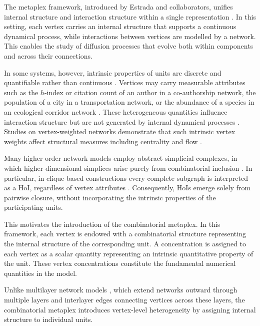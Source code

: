 \documentclass[12pt]{article}
\theoremstyle{normalhead_nobrackets}
\theoremstyle{exampstyle}
\begin{document}
The metaplex framework, introduced by Estrada and collaborators, unifies internal structure and interaction structure within a single representation \cite{estrada2020metaplex, miranda2023simplicial}. In this setting, each vertex carries an internal structure that supports a continuous dynamical process, while interactions between vertices are modelled by a network. This enables the study of diffusion processes that evolve both within components and across their connections.

In some systems, however, intrinsic properties of units are discrete and quantifiable rather than continuous \cite{bairey2016high, badalyan2024structure, nakajima2025inference, contisciani2025flexible}. Vertices may carry measurable attributes such as the 
$h$-index or citation count of an author in a co-authorship network, the population of a city in a transportation network, or the abundance of a species in an ecological corridor network \cite{singh2020node, shanu2019graph, contisciani2025flexible}. These heterogeneous quantities influence interaction structure but are not generated by internal dynamical processes \cite{miranda2023simplicial}. Studies on vertex-weighted networks demonstrate that such intrinsic vertex weights affect structural measures including centrality and flow \cite{singh2020node}.

Many higher-order network models employ abstract simplicial complexes, in which higher-dimensional simplices arise purely from combinatorial inclusion \cite{zhao2021simplicial}. In particular, in clique-based constructions every complete subgraph is interpreted as a HoI, regardless of vertex attributes \cite{raj2024structure, giusti2016two}. Consequently, HoIs emerge solely from pairwise closure, without incorporating the intrinsic properties of the participating units.

This motivates the introduction of the combinatorial metaplex. In this framework, each vertex is endowed with a combinatorial structure representing the internal structure of the corresponding unit. A concentration is assigned to each vertex as a scalar quantity representing an intrinsic quantitative property of the unit. These vertex concentrations constitute the fundamental numerical quantities in the model.

Unlike multilayer network models \cite{boccaletti2014structure,kivela2014multilayer}, which extend networks outward through multiple layers and interlayer edges connecting vertices across these layers, the combinatorial metaplex introduces vertex-level heterogeneity by assigning internal structure to individual units.
\end{document}
